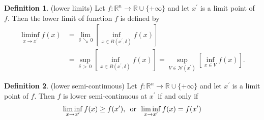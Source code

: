 \documentclass{jsarticle}
\theoremstyle{definition}
\newtheorem{dfn}{Definition}[section]
\begin{document}
\begin{dfn}(lower limits)
  Let $f: \mathbb{R}^n \to \mathbb{R} \cup \{+ \infty\}$ and let $x^{\prime}$ is a limit point of $f$. Then the lower limit of function $f$ is defined by 
  \begin{align*}
      \liminf_{x \to x^{\prime}}{f(x)} &= \lim_{\delta \, \searrow \, 0} {[\inf_{x \in B(x^{\prime}, \delta)}{f(x)}]} \\
                                        &= \sup_{\delta \, > \, 0} {[\inf_{x \in B(x^{\prime}, \delta)}{f(x)}]} 
                                        = \sup_{V \in \mathcal{N}(x^{\prime})} {[\inf_{x \in V}{f(x)}]}. 
  \end{align*}
\end{dfn}

\begin{dfn}(lower semi-continuous)
  Let $f: \mathbb{R}^n \to \mathbb{R} \cup \{+ \infty\}$ and let $x^{\prime}$ is a limit point of $f$. Then $f$ is lower semi-continuous at $x^{\prime}$ if and only if
  \[
      \liminf_{x \to x^{\prime}} {f(x)} \ge f(x^{\prime}), \text{\, or \,} \liminf_{x \to x^{\prime}} {f(x)} = f(x^{\prime}) 
  \]
\end{dfn}
\end{document}
